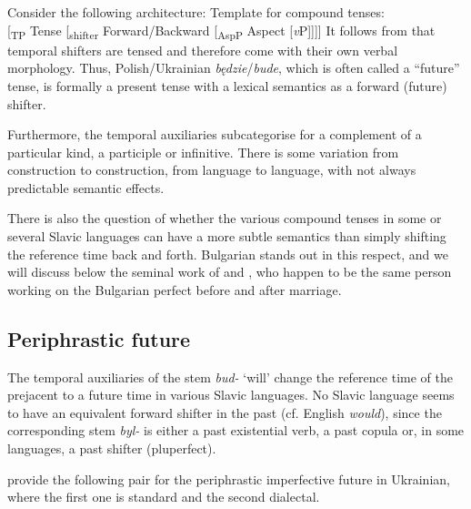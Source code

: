 \documentclass[output=paper,colorlinks,citecolor=brown]{langscibook}
\begin{document}
Consider the following architecture:
\ea\label{ex3XX}
Template for compound tenses: \\
{[}{\textsubscript{TP}} Tense [{\textsubscript{shifter}} Forward/Backward [{\textsubscript{AspP}} Aspect [\textit{v}P]]]]
\z
 It follows from  that 
temporal shifters are tensed
and therefore come with their own verbal morphology. Thus, Polish/Ukrainian {\textit{b{ę}dzie}}/\textit{bude}, which is often called a ``future'' tense, is formally a present tense with a lexical semantics as a forward (future) shifter. 

Furthermore, the temporal auxiliaries subcategorise for a complement of a particular kind, a participle or infinitive. There is some variation from construction to construction, from language to language, with not always predictable semantic effects. 

There is also the question of whether the various compound tenses in some or several Slavic languages can have a more  subtle semantics than simply shifting the reference time back and forth. Bulgarian stands out in this respect, and we will discuss below the seminal work of \citet{Izvorski1997} and \citet{pancheva03}, who happen to be the same person working on the Bulgarian perfect  before and after marriage.

\subsection{Periphrastic future}\label{pfut}
The temporal auxiliaries of the stem \textit{bud-} `will'  change the reference time of the prejacent to a future time in various Slavic languages. No Slavic language seems to have an equivalent forward shifter in the past (cf. English \textit{would}), since the corresponding stem  \textit{byl-} is either a past existential verb, a past copula or, in some languages, a past shifter (pluperfect).

\citet{stechow99} provide the following pair for the periphrastic imperfective future in Ukrainian, where the first one is standard and the second dialectal.
\end{document}

